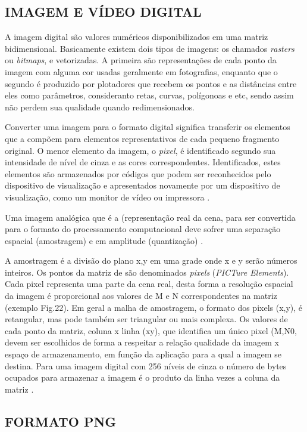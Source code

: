 \subsection{IMAGEM E VÍDEO DIGITAL}\label{subsec:imagem}

A imagem digital são valores numéricos disponibilizados em uma matriz bidimensional. Basicamente existem dois tipos de imagens: os chamados \textit{rasters} ou \textit{bitmaps}, e vetorizadas. A primeira são representações de cada ponto da imagem com alguma cor usadas geralmente em fotografias, enquanto que o segundo é produzido por plotadores que recebem os pontos e as distâncias entre eles como parâmetros, consideranto retas, curvas, polígonoas e etc, sendo assim não perdem sua qualidade quando redimensionados.

Converter uma imagem para o formato digital significa transferir os elementos que a compõem para elementos representativos de cada pequeno fragmento original. O menor elemento da imagem, o \textit{pixel}, é identificado segundo sua intensidade de nível de cinza e as cores correspondentes. Identificados, estes elementos são armazenados por códigos que podem ser reconhecidos pelo dispositivo de visualização e apresentados novamente por um dispositivo de visualização, como um monitor de vídeo ou impressora \cite{img-digital-willians}. 

Uma imagem analógica que é a (representação real da cena, para ser convertida para o formato do
processamento computacional deve sofrer uma separação espacial (amostragem) e em amplitude
(quantização) \cite{img-digital-willians}. 

A amostragem é a divisão do plano x,y em uma grade onde x e y serão números inteiros. Os pontos da
matriz de são denominados \textit{pixels} (\textit{PICTure Elements}). Cada pixel representa uma parte da cena real, desta
forma a resolução espacial da imagem é proporcional aos valores de M e N correspondentes na matriz
(exemplo Fig.22). Em geral a malha de amostragem, o formato dos pixels (x,y), é retangular, mas pode também
ser triangular ou mais complexa. Os valores de cada ponto da matriz, coluna x linha (xy), que identifica um
único pixel (M,N0, devem ser escolhidos de forma a respeitar a relação qualidade da imagem x espaço de
armazenamento, em função da aplicação para a qual a imagem se destina. Para uma imagem digital com 256
níveis de cinza o número de bytes ocupados para armazenar a imagem é o produto da linha vezes a coluna da
matriz \cite{img-digital-willians}. 


\subsection{FORMATO PNG}\label{subsec:png}

